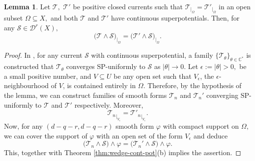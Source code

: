 \documentclass[11pt]{amsart}
\theoremstyle{definition}
\newtheorem{lemma}[theorem]{Lemma}
\newcommand{\lmto}{\longmapsto}
\newcommand{\C}{\mathbb{C}}
\newcommand{\sD}{\mathscr{D}}
\newcommand{\sT}{\mathscr{T}}
\newcommand{\sS}{\mathscr{S}}
\begin{document}
\begin{lemma}\label{lem:local-equality}
    Let $\sT,$ $\sT'$ be positive closed currents such that $\sT_{|_\Omega} = \sT'_{|_\Omega}$ in an open subset $\Omega \subseteq X,$ and both $\sT$ and $\sT'$ have continuous superpotentials. Then, for any $\sS \in \sD^{r}(X),$ 
    $$
     \big(\sT\wedge \sS\big) _{|_\Omega} =   \big(\sT' \wedge \sS \big) _{|_\Omega}.
    $$
\end{lemma}
\begin{proof}
In \cite{Dinh-Sibony:Kahler}, for any current $\sS$ with continuous superpotential, a family $\{\sT_{\theta}\}_{\theta \in \C^*}$ is constructed that $\sT_{\theta}$ converges SP-uniformly to $\sS$ as $|\theta| \to 0.$  Let $\epsilon :=|\theta|>0,$ be a small positive number, and $V\subseteq U$ be any open set such that $V_{\epsilon}$, the $\epsilon$-neighbourhood of $V$, is contained entirely in $\Omega.$ Therefore, by the hypothesis of the lemma, we can construct families of smooth forms $\sT_n$ and $\sT_n'$ converging $\textrm{SP}$-uniformly to $\sT$ and $\sT'$ respectively. Moreover,  
$${\sT_n}_{|_{V_{\epsilon}}} = {\sT'_n}_{|_{V_{\epsilon}}}.$$ 
Now, for any $(d-q-r, d-q-r)$ smooth form $\varphi$ with compact support on $\Omega,$ we can cover the support of $\varphi$ with an open set of the form $V_{\epsilon}$ and deduce
$$
     \big(\sT_n \wedge \sS \big)\wedge \varphi =   \big(\sT_n' \wedge \sS \big) \wedge \varphi.
$$
This, together with Theorem \ref{thm:wedge-cont-pot}(b) implies the assertion.

\end{proof}
\end{document}
